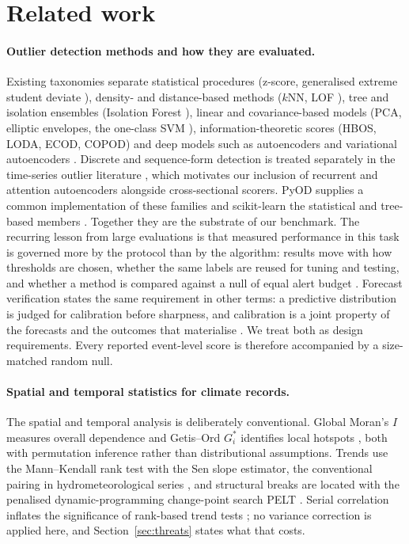 \documentclass[preprint,12pt]{elsarticle}
\begin{document}
\section{Related work}\label{sec:related}

\paragraph{Outlier detection methods and how they are evaluated.}
Existing taxonomies separate statistical procedures (z-score, generalised
extreme student deviate \cite{rosner1983}), density- and distance-based methods
($k$NN, LOF \cite{breunig2000}), tree and isolation ensembles (Isolation Forest
\cite{liu2008}), linear and covariance-based models (PCA, elliptic envelopes,
the one-class SVM \cite{schoelkopf2001}), information-theoretic scores (HBOS,
LODA, ECOD, COPOD) and deep models such as autoencoders and variational
autoencoders \cite{chandola2009survey,chandola2009,pang2021}. Discrete and
sequence-form detection is treated separately in the time-series outlier
literature \cite{chandola2009,blazquez2021}, which motivates our inclusion of
recurrent and attention autoencoders alongside cross-sectional scorers. PyOD
supplies a common implementation of these families \cite{zhao2019} and
scikit-learn the statistical and tree-based members \cite{pedregosa2011}.
Together they are the substrate of our benchmark.
The recurring lesson from large evaluations is that measured performance in
this task is governed more by the protocol than by the algorithm: results move
with how thresholds are chosen, whether the same labels are reused for tuning
and testing, and whether a method is compared against a null of equal alert
budget \cite{schmidl2022}. Forecast verification states the same requirement
in other terms: a predictive distribution is judged for calibration before
sharpness, and calibration is a joint property of the forecasts and the
outcomes that materialise \cite{gneiting2007}. We treat both as design
requirements. Every reported event-level score is therefore accompanied by a
size-matched random null.

\paragraph{Spatial and temporal statistics for climate records.}
The spatial and temporal analysis is deliberately conventional. Global
Moran's $I$ measures overall dependence \cite{anselin1995} and Getis--Ord
$G_i^*$ identifies local hotspots \cite{getis1992}, both with permutation
inference rather than distributional assumptions. Trends use the Mann--Kendall
rank test with the Sen slope estimator, the conventional pairing in
hydrometeorological series \cite{sen1968,yue2004}, and structural breaks are
located with the penalised dynamic-programming change-point search PELT
\cite{killick2012}. Serial correlation inflates the significance of rank-based
trend tests \cite{hamed1998,yue2004}; no variance correction is applied here,
and Section~\ref{sec:threats} states what that costs.
\end{document}
